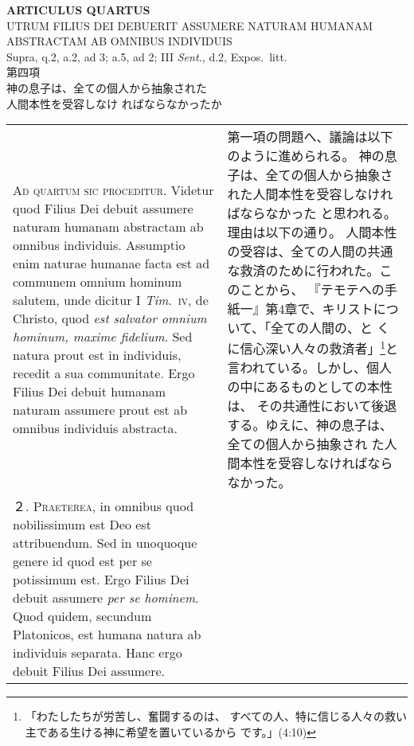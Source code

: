 \documentclass[10pt]{jsarticle} %
\begin{document}
\begin{center}
 {\Large {\bf ARTICULUS QUARTUS}}\\
 {\large UTRUM FILIUS DEI DEBUERIT ASSUMERE NATURAM HUMANAM\\ABSTRACTAM
 AB OMNIBUS INDIVIDUIS}\\
 {\footnotesize Supra, q.2, a.2, ad 3; a.5, ad 2; III {\itshape Sent.},
 d.2, Expos.~litt.}\\
 {\Large 第四項\\神の息子は、全ての個人から抽象された\\人間本性を受容しなけ
 ればならなかったか}
\end{center}

\begin{longtable}{p{21em}p{21em}}

{\Huge A}{\scshape d quartum sic proceditur}. Videtur quod Filius Dei debuit assumere
naturam humanam abstractam ab omnibus individuis. Assumptio enim naturae
humanae facta est ad communem omnium hominum salutem, unde dicitur I
{\itshape Tim}.~{\scshape iv}, de Christo, quod {\itshape est salvator omnium hominum, maxime
fidelium}. Sed natura prout est in individuis, recedit a sua
communitate. Ergo Filius Dei debuit humanam naturam assumere prout est
ab omnibus individuis abstracta.


&


第一項の問題へ、議論は以下のように進められる。
神の息子は、全ての個人から抽象された人間本性を受容しなければならなかった
 と思われる。理由は以下の通り。
人間本性の受容は、全ての人間の共通な救済のために行われた。このことから、
 『テモテへの手紙一』第4章で、キリストについて、「全ての人間の、と
 くに信心深い人々の救済者」\footnote{「わたしたちが労苦し、奮闘するのは、
 すべての人、特に信じる人々の救い主である生ける神に希望を置いているから
 です。」(4:10)}と言われている。しかし、個人の中にあるものとしての本性は、
 その共通性において後退する。ゆえに、神の息子は、全ての個人から抽象され
 た人間本性を受容しなければならなかった。

\\



２. {\scshape Praeterea}, in omnibus quod nobilissimum est Deo est attribuendum. Sed in
unoquoque genere id quod est per se potissimum est. Ergo Filius Dei
debuit assumere {\itshape per se hominem}. Quod quidem, secundum Platonicos, est
humana natura ab individuis separata. Hanc ergo debuit Filius Dei
assumere.


&



\end{longtable}
\end{document}
